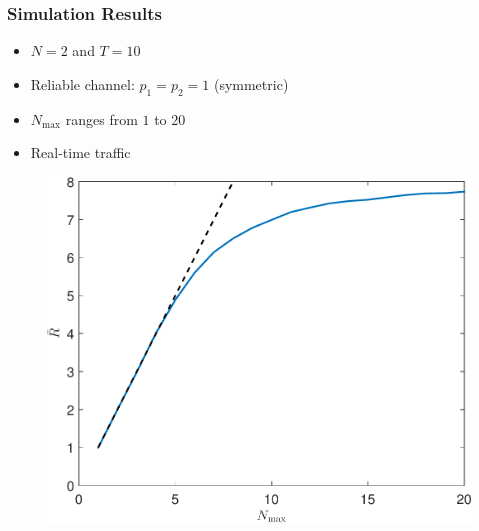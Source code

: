 \documentclass{beamer}
\begin{document}
\begin{frame}
\frametitle{Simulation Results}
\begin{itemize}
\item $N=2$ and $T=10$
\item Reliable channel: $p_1 = p_2 = 1$ (symmetric)
\item $N_\text{max}$ ranges from $1$ to $20$
\item Real-time traffic
\end{itemize}
\begin{figure}
\centering
\includegraphics[height=.5\textheight]{realtime_throughput_randmax.pdf}
\end{figure}
\end{frame}
\end{document}

